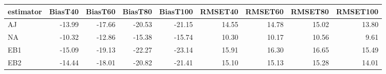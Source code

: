 \begin{table}[ht]
\centering
\begin{tabular}{lrrrrrrrr}
  \toprule
estimator & BiasT40 & BiasT60 & BiasT80 & BiasT100 & RMSET40 & RMSET60 & RMSET80 & RMSET100 \\ 
  \midrule
AJ & -13.99 & -17.66 & -20.53 & -21.15 & 14.55 & 14.78 & 15.02 & 13.80 \\ 
  NA & -10.32 & -12.86 & -15.38 & -15.74 & 10.30 & 10.17 & 10.56 & 9.61 \\ 
  EB1 & -15.09 & -19.13 & -22.27 & -23.14 & 15.91 & 16.30 & 16.65 & 15.49 \\ 
  EB2 & -14.44 & -18.01 & -20.82 & -21.41 & 15.10 & 15.13 & 15.28 & 14.01 \\ 
   \bottomrule
\end{tabular}
\end{table}

